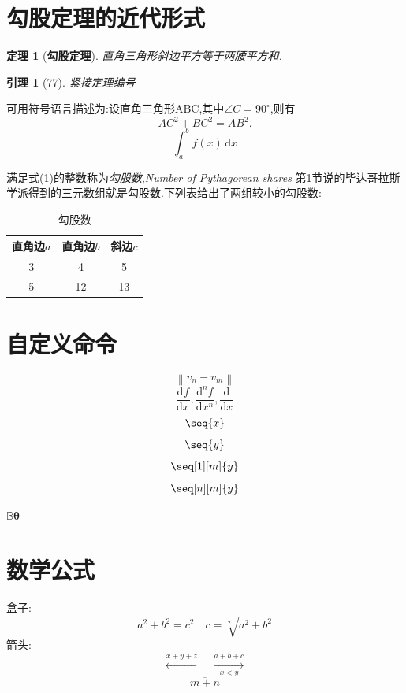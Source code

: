 \documentclass[UTF8,a4paper,8pt,no-math]{article} %
\newtheorem{thm}{定理}[section]%
\newtheorem{lemma}{引理}[thm]%
\numberwithin{equation}{section} %
\newcommand\norm[1]{\left\|#1\right\|} %
\newcommand\dv[3][]{\frac{\mathrm{d}^{#1} #2}{\mathrm{d} #3^{#1}}} %
\newcommand{\BB}{\mathbb{B}}
\newcommand{\thetab}{\boldsymbol{\theta}}
\begin{document}
\section{勾股定理的近代形式}

\begin{thm}[{\color{NavyBlue}\textbf{勾股定理}}]
	直角三角形斜边平方等于两腰平方和.
\end{thm}
\begin{lemma}[77]
	紧接定理编号
\end{lemma}

可用符号语言描述为:设直角三角形ABC,其中$\angle C=90^\circ$,则有
\begin{equation}%
	AC^2+BC^2=AB^2.
\end{equation}
\begin{equation}
	\int_{a}^{b} f(x) \,\mathrm{d}x
\end{equation}

满足式(1)的整数称为\emph{勾股数},\emph{Number of Pythagorean shares} %
第1节说的毕达哥拉斯学派得到的三元数组就是勾股数.下列表给出了两组较小的勾股数:

\begin{table}[h]
	\center
	\begin{tabular}{ccc}%
		\hline %
		直角边$a$ & 直角边$b$ & 斜边$c$ \\ %
		\hline
		3         & 4         & 5       \\
		5         & 12        & 13      \\
		\hline
	\end{tabular}
	\caption{勾股数}
\end{table}

\section{自定义命令}

\[
	\norm{v_n-v_m}
\]
\[
	\dv{f}{x},\dv[n]{f}{x},\dv{}{x}
\]
\[
	\seq{x}
\]
\[
	\seq{y}
\]
\[
	\seq[1][m]{y}
\]
\[
	\seq[n][m]{y}
\]

$\BB \thetab$


\section{数学公式}
盒子:
\[
	\boxed{a^2+b^2=c^2} \quad
	c = \sqrt[2]{a^2 + b^2}
\]
箭头:
\[
	\xleftarrow{x+y+z}\quad\xrightarrow[x<y]{a+b+c} %
\]
\begin{equation*}
	\overline{m+n}
\end{equation*}
\end{document}
